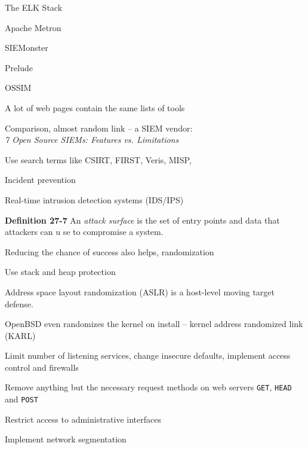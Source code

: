 \documentclass[Screen16to9,17pt]{foils}
\begin{document}
\begin{list2}
\item The ELK Stack
\item Apache Metron
\item SIEMonster
\item Prelude
\item OSSIM
\end{list2}
A lot of web pages contain the same lists of tools

Comparison, almost random link -- a SIEM vendor:\\
\emph{7 Open Source SIEMs: Features vs. Limitations}\\





\begin{quote}

\end{quote}

\begin{list2}
  \item Use search terms like CSIRT, FIRST, Veris, MISP,
\end{list2}






\begin{list2}
\item Incident prevention
\item Real-time intrusion detection systems (IDS/IPS)
\item {\bf Definition 27-7} An \emph{attack surface} is the set of entry points and data that attackers can u
se to compromise a system.
\item Reducing the chance of success also helps, randomization
\item Use stack and heap protection
\item Address space layout randomization (ASLR) is a host-level moving target defense.
\item OpenBSD even randomizes the kernel on install -- kernel address randomized link (KARL)
\item Limit number of listening services, change insecure defaults, implement access control and firewalls
\item Remove anything but the necessary request methods on web servers \verb+GET+, \verb+HEAD+ and \verb+POST+
\item Restrict access to administrative interfaces
\item Implement network segmentation
\end{list2}
\end{document}
